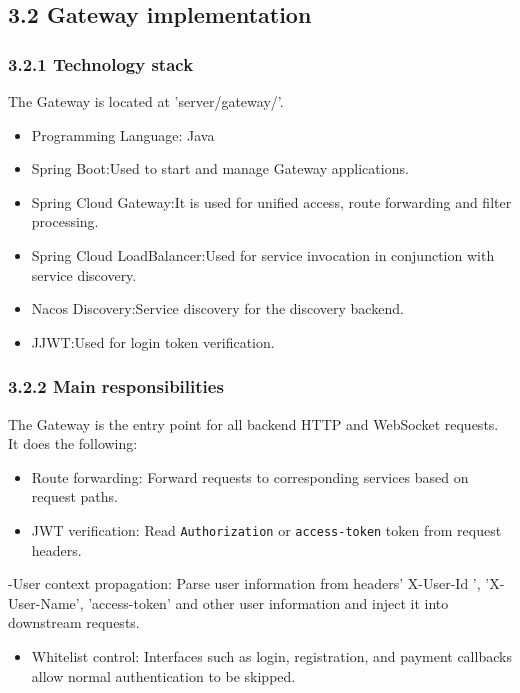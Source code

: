 \documentclass{article}
\begin{document}
\subsection{3.2 Gateway implementation}

\subsubsection{3.2.1 Technology stack}

The Gateway is located at 'server/gateway/'.

\begin{itemize}
    \item Programming Language: Java
    \item Spring Boot:Used to start and manage Gateway applications.
    \item Spring Cloud Gateway:It is used for unified access, route forwarding and filter processing.
    \item Spring Cloud LoadBalancer:Used for service invocation in conjunction with service discovery.
    \item Nacos Discovery:Service discovery for the discovery backend.
    \item JJWT:Used for login token verification.
\end{itemize}

\subsubsection{3.2.2 Main responsibilities}

The Gateway is the entry point for all backend HTTP and WebSocket requests. It does the following:

\begin{itemize}
    \item Route forwarding: Forward requests to corresponding services based on request paths.
    \item JWT verification: Read \texttt{Authorization} or \texttt{access-token} token from request headers.
\end{itemize}

-User context propagation: Parse user information from headers' X-User-Id ', 'X-User-Name', 'access-token' and other user information and inject it into downstream requests.

\begin{itemize}
    \item Whitelist control: Interfaces such as login, registration, and payment callbacks allow normal authentication to be skipped.
\end{itemize}
\end{document}
